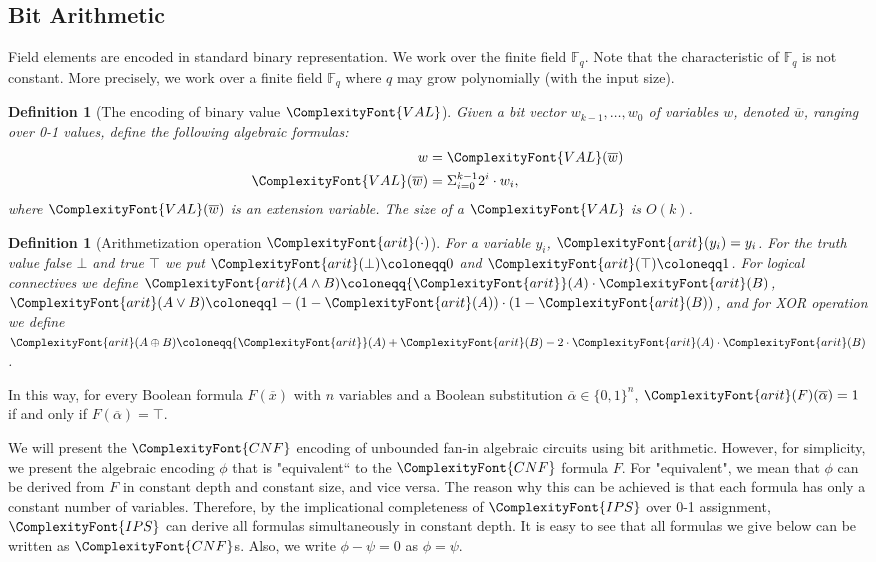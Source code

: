 \documentclass[11pt,letter]{article}
\newtheorem{definition}[theorem]{Definition}
\theoremstyle{remark} %
\newcommand{\IPS}{%
    {
        \ComplexityFont{IPS} 
    }
}
\newcommand{\CNF}{ %
    {
        \ComplexityFont{CNF}
    }
}
\newcommand{\VAL}{ %
    {
        \ComplexityFont{VAL}
    }
}
\newcommand{\arit}{ %
    {
        \ComplexityFont{arit}
    }
}
\begin{document}
{\subsection{Bit Arithmetic}
Field elements are encoded in standard binary representation. We work over the finite field $\mathbb{F}_q$. Note that the characteristic of $\mathbb{F}_q$ is not constant. More precisely, we work over a finite field $\mathbb{F}_q$ where $q$ may grow polynomially (with the input size). 
    \begin{definition}[The encoding of binary value $\VAL$]
        \label{def: binary value VAL}
        Given a bit vector $w_{k-1},\dots,w_0$ of variables $w$, denoted $\overline{w}$, ranging over 0-1 values, define the following algebraic formulas:
        \begin{align*}
            w&=\VAL(\overline{w})\\
            \VAL(\overline{w}) &= \Sigma_{i=0}^{k-1} 2^i \cdot w_i,
        \end{align*}
        where $\VAL(\overline{w})$ is an extension variable. The size of a $\VAL$ is $O(k)$. 
    \end{definition}
    \begin{definition}[Arithmetization operation $\arit(\cdot)$] 
        \label{def: arithmetization operation arit}
        For a variable $y_i$, $\arit(y_i)=y_i$. For the truth value false $\bot$ and true $\top$ we put $\arit(\bot) \coloneqq  0$ and $\arit(\top) \coloneqq  1$. For logical connectives we define $\arit(A \land B) \coloneqq \arit(A) \cdot \arit(B)$, $\arit(A \lor B) \coloneqq 1- (1-\arit(A))\cdot (1-\arit(B))$, and for XOR operation we define $\arit(A\oplus B) \coloneqq \arit(A)+\arit(B)-2 \cdot \arit(A) \cdot \arit(B)$.
    \end{definition}
    In this way, for every Boolean formula $F(\overline{x})$ with $n$ variables and a Boolean substitution $\overline{\alpha} \in \{0,1\}^n$,
    $\arit(F)(\overline{\alpha})=1$ if and only if $F(\overline{\alpha})=\top$.

    We will present the $\CNF$ encoding of unbounded fan-in algebraic circuits using bit arithmetic. However, for simplicity, we present the algebraic encoding $\phi$ that is "equivalent`` to the $\CNF$ formula $ F$. For "equivalent", we mean that $\phi$ can be derived from $F$ in constant depth and constant size, and vice versa. The reason why this can be achieved is that each formula has only a constant number of variables. Therefore, by the implicational completeness of $\IPS$ over 0-1 assignment, $\IPS$ can derive all formulas simultaneously in constant depth.  It is easy to see that all formulas we give below can be written as $\CNF$s. Also, we write $\phi-\psi =0$ as $\phi= \psi$.


}
\end{document}
